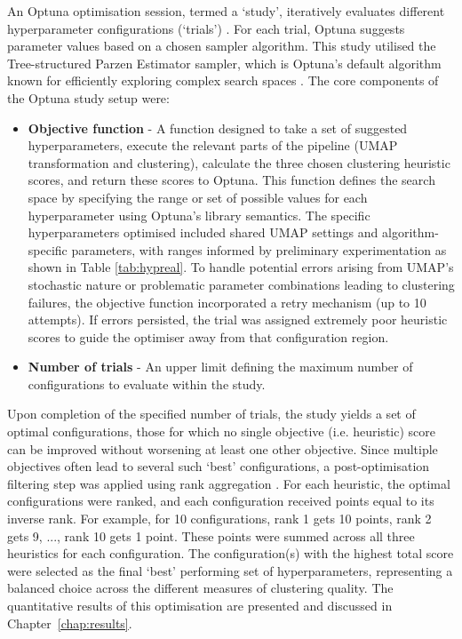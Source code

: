\documentclass[10pt,oneside]{report}
\begin{document}
An Optuna optimisation session, termed a `study', iteratively evaluates different hyperparameter configurations (`trials') \cite{akiba2019optuna}. For each trial, Optuna suggests parameter values based on a chosen sampler algorithm. This study utilised the Tree-structured Parzen Estimator sampler, which is Optuna's default algorithm known for efficiently exploring complex search spaces \cite{watanabe2023tree}. The core components of the Optuna study setup were:   

\begin{itemize}
    \item \textbf{Objective function} - A function designed to take a set of suggested hyperparameters, execute the relevant parts of the pipeline (UMAP transformation and clustering), calculate the three chosen clustering heuristic scores, and return these scores to Optuna. This function defines the search space by specifying the range or set of possible values for each hyperparameter using Optuna's library semantics. The specific hyperparameters optimised included shared UMAP settings and algorithm-specific parameters, with ranges informed by preliminary experimentation as shown in Table \ref{tab:hypreal}. To handle potential errors arising from UMAP's stochastic nature or problematic parameter combinations leading to clustering failures, the objective function incorporated a retry mechanism (up to 10 attempts). If errors persisted, the trial was assigned extremely poor heuristic scores to guide the optimiser away from that configuration region.
    \item \textbf{Number of trials} - An upper limit defining the maximum number of configurations to evaluate within the study.
\end{itemize}


Upon completion of the specified number of trials, the study yields a set of optimal configurations, those for which no single objective (i.e. heuristic) score can be improved without worsening at least one other objective. Since multiple objectives often lead to several such `best' configurations, a post-optimisation filtering step was applied using rank aggregation \cite{li2019comparative}. For each heuristic, the optimal configurations were ranked, and each configuration received points equal to its inverse rank. For example, for 10 configurations, rank 1 gets 10 points, rank 2 gets 9, ..., rank 10 gets 1 point. These points were summed across all three heuristics for each configuration. The configuration(s) with the highest total score were selected as the final `best' performing set of hyperparameters, representing a balanced choice across the different measures of clustering quality. The quantitative results of this optimisation are presented and discussed in Chapter~\ref{chap:results}.
\end{document}
